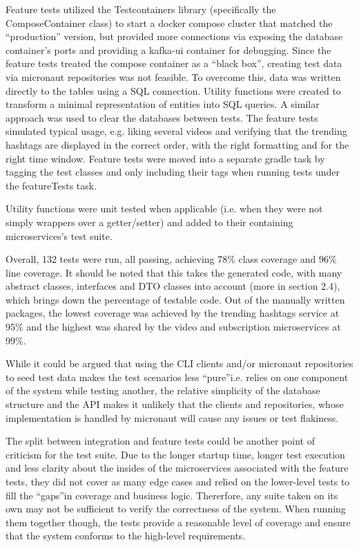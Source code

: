 \documentclass[parskip=full]{article}
\begin{document}
    Feature tests utilized the Testcontainers library (specifically the ComposeContainer \cite{composeTestContainer} class) to start a docker compose cluster that matched the ``production'' version, but provided more connections via exposing the database container's ports and providing a kafka-ui container for debugging.
    Since the feature tests treated the compose container as a ``black box'', creating test data via micronaut repositories was not feasible.
    To overcome this, data was written directly to the tables using a SQL connection.
    Utility functions were created to transform a minimal representation of entities into SQL queries.
    A similar approach was used to clear the databases between tests.
    The feature tests simulated typical usage, e.g. liking several videos and verifying that the trending hashtags are displayed in the correct order, with the right formatting and for the right time window.
    Feature tests were moved into a separate gradle task by tagging the test classes and only including their tags when running tests under the featureTests task.

    Utility functions were unit tested when applicable (i.e. when they were not simply wrappers over a getter/setter) and added to their containing microservices's test suite.

    Overall, 132 tests were run, all passing, achieving 78\% class coverage and 96\% line coverage.
    It should be noted that this takes the generated code, with many abstract classes, interfaces and DTO classes into account (more in section 2.4), which brings down the percentage of testable code.
    Out of the manually written packages, the lowest coverage was achieved by the trending hashtags service at 95\% and the highest was shared by the video and subscription microservices at 99\%.

    While it could be argued that using the CLI clients and/or micronaut repositories to seed test data makes the test scenarios less ``pure''i.e. relies on one component of the system while testing another, the relative simplicity of the database structure and the API makes it unlikely that the clients and repositories, whose implementation is handled by micronaut will cause any issues or test flakiness.

    The split between integration and feature tests could be another point of criticism for the test suite.
    Due to the longer startup time, longer test execution and less clarity about the insides of the microservices associated with the feature tests, they did not cover as many edge cases and relied on the lower-level tests to fill the ``gaps''in coverage and business logic.
    Thererfore, any suite taken on its own may not be sufficient to verify the correctness of the system.
    When running them together though, the tests provide a reasonable level of coverage and ensure that the system conforms to the high-level requirements.
\end{document}
